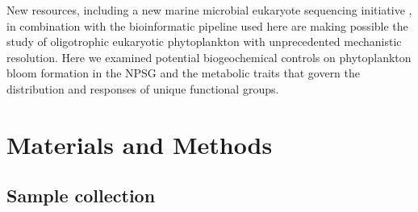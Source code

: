 New resources, including a new marine microbial eukaryote sequencing initiative \citep{Keeling2014}, in combination with the bioinformatic pipeline used here are making possible the study of oligotrophic eukaryotic phytoplankton with unprecedented mechanistic resolution. Here we examined potential biogeochemical controls on phytoplankton bloom formation in the NPSG and the metabolic traits that govern the distribution and responses of unique functional groups. \par

\section{Materials and Methods}
\subsection{Sample collection}

